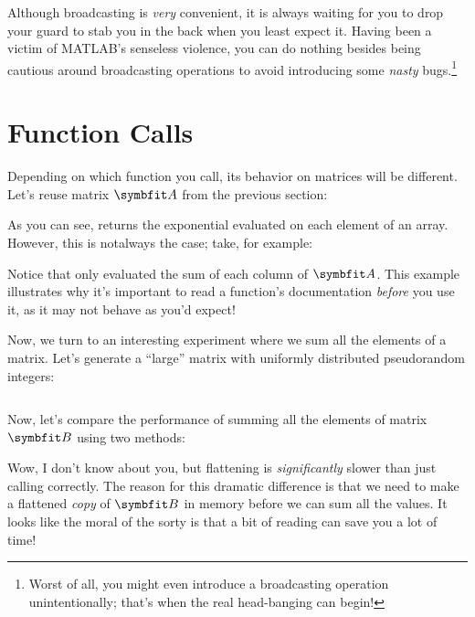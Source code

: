 \documentclass{article}
\begin{document}
Although broadcasting is \emph{very} convenient, it is always waiting
for you to drop your guard to stab you in the back when you least expect
it.  Having been a victim of MATLAB's senseless violence, you can do
nothing besides being cautious around broadcasting operations to avoid
introducing some \emph{nasty} bugs.\footnote{Worst of all, you might
even introduce a broadcasting operation unintentionally; that's when
the real head-banging can begin!}

\section{Function Calls}

Depending on which function you call, its behavior on matrices will be
different.  Let's reuse matrix \(\mat{A}\) from the previous section:


As you can see,  returns the exponential evaluated on each element of an
array. However, this is notalways the case; take, for example:


Notice that  only evaluated the sum of each column of \(\mat{A}\). This
example illustrates why it's important to read a function's
documentation \emph{before} you use it, as it may not behave as you'd
expect!

Now, we turn to an interesting experiment where we sum all the elements
of a matrix. Let's generate a \enquote{large} matrix with uniformly
distributed pseudorandom integers:

\inputminted{matlab}{02-vectorization.d/randi.m}

Now, let's compare the performance of summing all the elements of matrix
\(\mat{B}\) using two methods:



Wow, I don't know about you, but flattening is \emph{significantly}
slower than just calling  correctly.  The reason for this dramatic
difference is that we need to make a flattened \emph{copy} of
\(\mat{B}\) in memory before we can sum all the values.  It looks like
the moral of the sorty is that a bit of reading can save you a lot of
time!
\end{document}

